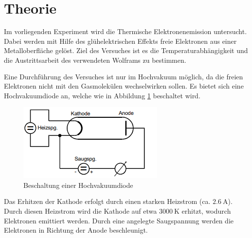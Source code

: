 \section{Theorie}
\label{sec:Theorie}
Im vorliegenden Experiment wird die Thermische Elektronenemission untersucht. Dabei werden mit Hilfe des glühelektrischen Effekts freie Elektronen aus einer Metalloberfläche gelöst.
Ziel des Versuches ist es die Temperaturabhängigkeit und die Austrittsarbeit des verwendeten Wolframs zu bestimmen.

Eine Durchführung des Versuches ist nur im Hochvakuum möglich, da die freien Elektronen nicht mit den Gasmolekülen wechselwirken sollen.
Es bietet sich eine Hochvakuumdiode an, welche wie in Abbildung \ref{fig:diode} beschaltet wird.
\begin{figure}
    \centering
    \caption{Beschaltung einer Hochvakuumdiode \cite{v504}}
    \label{fig:diode}
    \includegraphics[width = 0.5 \textwidth]{pics/Vakuumdiode.png}
\end{figure}
Das Erhitzen der Kathode erfolgt durch einen starken Heizstrom (ca. $\SI{2.6}{\ampere}$). Durch diesen Heizstrom wird die Kathode auf etwa $\SI{3000}{\kelvin}$ erhitzt, wodurch Elektronen emittiert werden.
Durch eine angelegte Saugspannung werden die Elektronen in Richtung der Anode beschleunigt.

